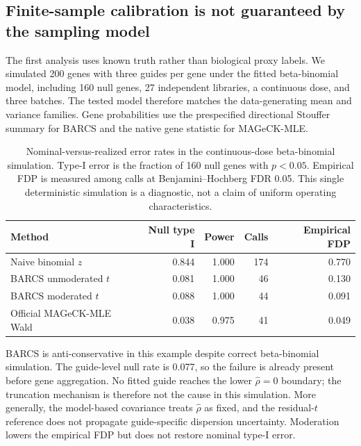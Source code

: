 \subsection{Finite-sample calibration is not guaranteed by the sampling model}
\label{sec:calibration}

The first analysis uses known truth rather than biological proxy labels.  We
simulated 200 genes with three guides per gene under the fitted beta-binomial
model, including 160 null genes, 27 independent libraries, a continuous dose,
and three batches.  The tested model therefore matches the data-generating mean
and variance families.  Gene probabilities use the prespecified directional
Stouffer summary for BARCS and the native gene statistic for MAGeCK-MLE.

\begin{table}[htbp]
\centering
\caption{Nominal-versus-realized error rates in the continuous-dose
beta-binomial simulation.  Type-I error is the fraction of 160 null genes with
$p<0.05$.  Empirical FDP is measured among calls at Benjamini--Hochberg FDR
0.05.  This single deterministic simulation is a diagnostic, not a claim of
uniform operating characteristics.}
\label{tab:type1}
\small
\setlength{\tabcolsep}{5pt}
\begin{tabular}{lrrrr}
\toprule
Method & Null type I & Power & Calls & Empirical FDP\\
\midrule
Naive binomial $z$ & 0.844 & 1.000 & 174 & 0.770\\
BARCS unmoderated $t$ & 0.081 & 1.000 & 46 & 0.130\\
BARCS moderated $t$ & 0.088 & 1.000 & 44 & 0.091\\
Official MAGeCK-MLE Wald & 0.038 & 0.975 & 41 & 0.049\\
\bottomrule
\end{tabular}
\end{table}

BARCS is anti-conservative in this example despite correct beta-binomial
simulation.  The guide-level null rate is 0.077, so the failure is already
present before gene aggregation.  No fitted guide reaches the lower
$\widehat\rho=0$ boundary; the truncation mechanism is therefore not the cause
in this simulation.  More generally, the model-based covariance treats
$\widehat\rho$ as fixed, and the residual-$t$ reference does not propagate
guide-specific dispersion uncertainty.  Moderation lowers the empirical FDP
but does not restore nominal type-I error.

